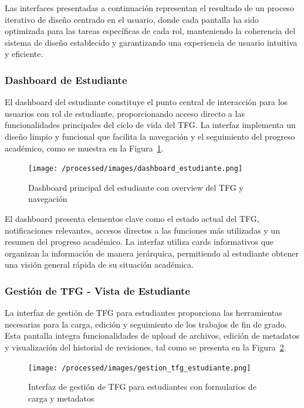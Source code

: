 \documentclass[12pt,a4paper,oneside]{report}
\begin{document}
Las interfaces presentadas a continuación representan el resultado de un proceso iterativo de diseño centrado en el usuario, donde cada pantalla ha sido optimizada para las tareas específicas de cada rol, manteniendo la coherencia del sistema de diseño establecido y garantizando una experiencia de usuario intuitiva y eficiente.

\subsubsection{Dashboard de Estudiante}\label{dashboard-de-estudiante}

El dashboard del estudiante constituye el punto central de interacción para los usuarios con rol de estudiante, proporcionando acceso directo a las funcionalidades principales del ciclo de vida del TFG. La interfaz implementa un diseño limpio y funcional que facilita la navegación y el seguimiento del progreso académico, como se muestra en la Figura~\ref{fig:dashboard-estudiante}.

\begin{figure}[H]
\centering
\texttt{[image: /processed/images/dashboard\_estudiante.png]}
\caption{Dashboard principal del estudiante con overview del TFG y navegación}
\label{fig:dashboard-estudiante}
\end{figure}

El dashboard presenta elementos clave como el estado actual del TFG, notificaciones relevantes, accesos directos a las funciones más utilizadas y un resumen del progreso académico. La interfaz utiliza cards informativos que organizan la información de manera jerárquica, permitiendo al estudiante obtener una visión general rápida de su situación académica.

\subsubsection{Gestión de TFG - Vista de Estudiante}\label{gestion-de-tfg---vista-de-estudiante}

La interfaz de gestión de TFG para estudiantes proporciona las herramientas necesarias para la carga, edición y seguimiento de los trabajos de fin de grado. Esta pantalla integra funcionalidades de upload de archivos, edición de metadatos y visualización del historial de revisiones, tal como se presenta en la Figura~\ref{fig:gestion-tfg-estudiante}.

\begin{figure}[H]
\centering
\texttt{[image: /processed/images/gestion\_tfg\_estudiante.png]}
\caption{Interfaz de gestión de TFG para estudiantes con formularios de carga y metadatos}
\label{fig:gestion-tfg-estudiante}
\end{figure}
\end{document}
